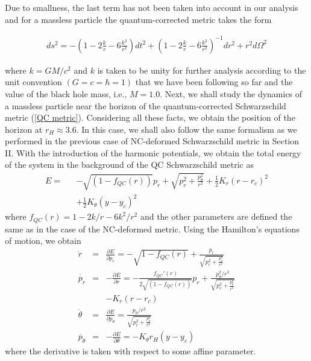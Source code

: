 \documentclass[aps,prd,showpacs,nofootinbib,floats,floatfix,preprintnumbers,groupedaddress,twocolumn]{revtex4-1}
\begin{document}
Due to smallness, the last term has not been taken into account in our analysis and for a massless particle the quantum-corrected metric takes the form
%
%
%
\begin{widetext}
	\begin{eqnarray}
	ds^2 = -\left(1-2\frac{k}{r}-6\frac{k^2}{r^2}\right)dt^2 + \left(1-2\frac{k}{r}-6\frac{k^2}{r^2}\right)^{-1} dr^2 + r^2 d\Omega^2\label{QC metric}
	\end{eqnarray}
\end{widetext}
%
%
%
where $k=GM/c^2$ and $k$ is taken to be unity for further analysis according to the unit convention $(G=c=\hbar=1)$ that we have been following so far and the value of the black hole mass, i.e., $M=1.0$. Next, we shall study the dynamics of a massless particle near the horizon of the quantum-corrected Schwarzschild metric (\ref{QC metric}). Considering all these facts, we obtain the position of the horizon at $r_H\approx 3.6$. In this case,  we shall also follow the same formalism as we performed in the previous case of NC-deformed Schwarzschild metric in Section II. With the introduction of the harmonic potentials, we obtain the total energy of the system in the background of the QC Schwarzschild metric as
%
%
%
%
%
\begin{eqnarray}
E = &&-\sqrt{(1-f_{QC}(r))}p_r +  \sqrt{p_r^2 + \frac{ p_\theta^2}{r^2}} + \frac{1}{2}K_r (r-r_c)^2 \nonumber\\
&&+ \frac{1}{2}K_\theta (y-y_c)^2\label{energy qc}
\end{eqnarray}  
where $f_{QC}(r)=1-2k/r-6k^2/r^2$ and the other parameters are defined the same as in the case of the NC-deformed metric. Using  the Hamilton's equations of motion, we obtain 
%
%
%
%
\begin{eqnarray}
\dot{r}&=&\frac{\partial E}{\partial p_{r}}=-\sqrt{1-f_{QC}(r)}+\frac{p_{r}}{\sqrt{p_{r}^{2}+\frac{p_{\theta}^{2}}{r^{2}}}}\label{rdot qc}\\
\dot{p_r}&=&- \frac{\partial E}{\partial r} = -\frac{f_{QC}'(r)}{2 \sqrt{(1-f_{QC}(r))}}p_r + \frac{p_\theta ^2 /r^3}{\sqrt{p_r^2 + \frac{ p_\theta ^2}{r^2}}}\nonumber\\
&&- K_r(r-r_c)\label{prdot qc}\\
\dot{\theta}&=&\frac{\partial E}{\partial p_\theta} = \frac{p_\theta /r^2}{\sqrt{p_r^2 + \frac{ p_\theta ^2}{r^2}}}\\\label{theta_dot qc}
\dot{p_\theta}&=& - \frac{\partial E}{\partial \theta} = -K_\theta r_H(y-y_c)\label{ptheta_dot qc}
\end{eqnarray} 
%
%
%
%
where the derivative is taken with respect to some affine parameter.
\end{document}
